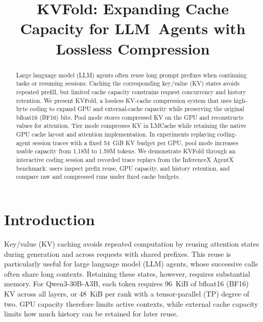 \documentclass[conference]{IEEEtran}
\title{KVFold: Expanding Cache Capacity for \mbox{LLM Agents} with Lossless Compression}
\author{\IEEEauthorblockN{Working draft}
\IEEEauthorblockA{Author information to be supplied}}
\begin{document}
\maketitle

\begin{abstract}
Large language model (LLM) agents often reuse long prompt prefixes when continuing tasks or resuming
sessions. Caching the corresponding key/value (KV) states avoids repeated
prefill, but limited cache capacity constrains request concurrency and history
retention. We present KVFold, a lossless KV-cache compression system that uses
high-byte coding to expand GPU and external-cache capacity while preserving
the original bfloat16 (BF16) bits. Pool mode stores compressed KV on the GPU and
reconstructs values for attention. Tier mode compresses KV in LMCache while
retaining the native GPU cache layout and attention implementation. In
experiments replaying coding-agent session traces with a fixed 54~GiB KV
budget per GPU, pool mode increases usable capacity from 1.18M to 1.59M
tokens. We demonstrate KVFold through an interactive coding session and
recorded trace replays from the InferenceX AgentX benchmark: users inspect
prefix reuse, GPU capacity, and history retention, and compare raw and
compressed runs under fixed cache budgets.
\end{abstract}

\section{Introduction}
Key/value (KV) caching avoids repeated computation by reusing attention states
during generation and across requests with shared prefixes. This reuse is
particularly useful for large language model (LLM) agents, whose successive
calls often share long
contexts. Retaining these states, however, requires substantial memory. For
Qwen3-30B-A3B, each token requires 96~KiB of bfloat16 (BF16) KV across all layers, or
48~KiB per rank with a tensor-parallel (TP) degree of two. GPU capacity
therefore limits active contexts, while external cache capacity limits how
much history can be retained for later reuse.
\end{document}
